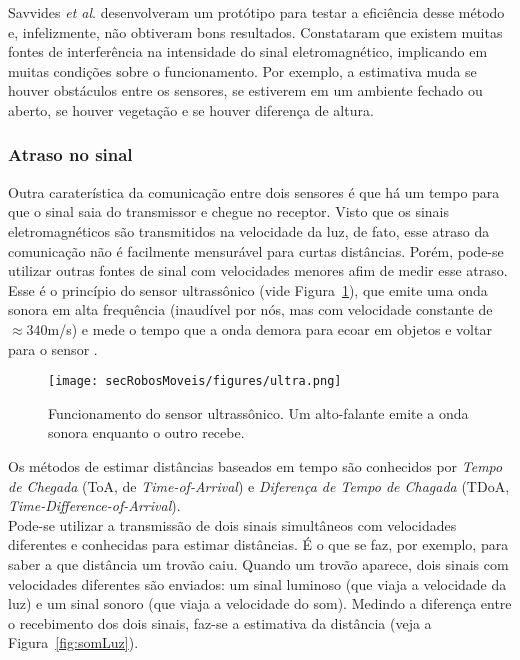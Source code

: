 Savvides \textit{et al}. \cite{savvides2001dynamic} desenvolveram um protótipo para testar a eficiência desse método e, infelizmente, não obtiveram bons resultados. Constataram que existem muitas fontes de interferência na intensidade do sinal eletromagnético, implicando em muitas condições sobre o funcionamento. Por exemplo, a estimativa muda se houver obstáculos entre os sensores, se estiverem em um ambiente fechado ou aberto, se houver vegetação e se houver diferença de altura.

\subsubsection{Atraso no sinal}

Outra caraterística da comunicação entre dois sensores é que há um tempo para que o sinal saia do transmissor e chegue no receptor. Visto que os sinais eletromagnéticos são transmitidos na velocidade da luz, de fato, esse atraso da comunicação não é facilmente mensurável para curtas distâncias. Porém, pode-se utilizar outras fontes de sinal com velocidades menores afim de medir esse atraso. Esse é o princípio do sensor ultrassônico (vide Figura~\ref{fig:ultrasonico}), que emite uma onda sonora em alta frequência (inaudível por nós, mas com velocidade constante de $\approx 340$m/s) e mede o tempo que a onda demora para ecoar em objetos e voltar para o sensor \cite{sensorsForMobileRobots}.

\begin{figure}[H]
	\begin{center}
		\texttt{[image: secRobosMoveis/figures/ultra.png]}
	\end{center}
	\caption{Funcionamento do sensor ultrassônico. Um alto-falante emite a onda sonora enquanto o outro recebe.}
	\label{fig:ultrasonico}
\end{figure}

Os métodos de estimar distâncias baseados em tempo são conhecidos por \textit{Tempo de Chegada} (ToA, de \textit{Time-of-Arrival}) e \textit{Diferença de Tempo de Chagada} (TDoA, \textit{Time-Difference-of-Arrival}). 
\\

Pode-se utilizar a transmissão de dois sinais simultâneos com velocidades diferentes e conhecidas para estimar distâncias. É o que se faz, por exemplo, para saber a que distância um trovão caiu. Quando um trovão aparece, dois sinais com velocidades diferentes são enviados: um sinal luminoso (que viaja a velocidade da luz) e um sinal sonoro (que viaja a velocidade do som).
Medindo a diferença entre o recebimento dos dois sinais, faz-se a estimativa da distância (veja a Figura~\ref{fig:somLuz}).

